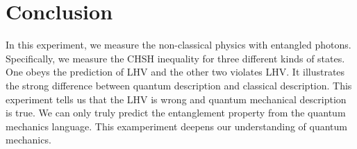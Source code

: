 \documentclass[12pt,a4paper]{article}
\begin{document}
\clearpage

\section{Conclusion}
In this experiment, we measure the non-classical physics with entangled photons. Specifically, we measure the CHSH inequality for three different kinds of states. One obeys the prediction of LHV and the other two violates LHV. It illustrates the strong difference between quantum description and classical description. This experiment tells us that the LHV is wrong and quantum mechanical description is true. We can only truly predict the entanglement property from the quantum mechanics language. This examperiment deepens our understanding of quantum mechanics.
%



%     



%

\label{Ende Literatur}



\label{Ende Anhang}
\end{document}
